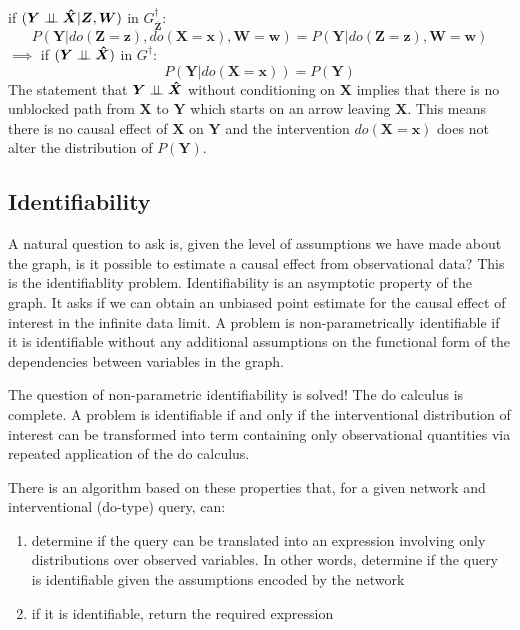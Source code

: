 \documentclass[11pt,a4paper,oneside]{book}
\theoremstyle{plain}
\theoremstyle{definition}
\begin{document}
if $(\boldsymbol{Y} \perp\!\!\!\perp \boldsymbol{\hat{X}} |\boldsymbol{Z},\boldsymbol{W})$ in $G^{\dagger}_{\boldsymbol{\overline{Z}}}$:
\begin{equation}
\label{eq:Do3}
P(\boldsymbol{Y}|do(\boldsymbol{Z}=\boldsymbol{z}),do(\boldsymbol{X}=\boldsymbol{x}),\boldsymbol{W}=\boldsymbol{w}) = P(\boldsymbol{Y}|do(\boldsymbol{Z}=\boldsymbol{z}),\boldsymbol{W}=\boldsymbol{w})
\end{equation}
$\implies$ if  $(\boldsymbol{Y} \perp\!\!\!\perp \boldsymbol{\hat{X}})$ in $G^{\dagger}$:
\begin{equation}
\label{eq:Do32}
P(\boldsymbol{Y}|do(\boldsymbol{X}=\boldsymbol{x})) = P(\boldsymbol{Y})
\end{equation}
The statement that $\boldsymbol{Y} \perp\!\!\!\perp \boldsymbol{\hat{X}}$ without conditioning on $\boldsymbol{X}$ implies that there is no unblocked path from $\boldsymbol{X}$ to $\boldsymbol{Y}$ which starts on an arrow leaving $\boldsymbol{X}$. This means there is no causal effect of $\boldsymbol{X}$ on $\boldsymbol{Y}$ and the intervention $do(\boldsymbol{X}=\boldsymbol{x})$ does not alter the distribution of $P(\boldsymbol{Y})$.

\subsection{Identifiability}
A natural question to ask is, given the level of assumptions we have made about the graph, is it possible to estimate a causal effect from observational data? This is the identifiablity problem. Identifiability is an asymptotic property of the graph. It asks if we can obtain an unbiased point estimate for the causal effect of interest in the infinite data limit. A problem is non-parametrically identifiable if it is identifiable without any additional assumptions on the functional form of the dependencies between variables in the graph. 

The question of non-parametric identifiability is solved! The do calculus is complete. A problem is identifiable if and only if the interventional distribution of interest can be transformed into term containing only observational quantities via repeated application of the do calculus. 

There is an algorithm \cite{Shpitser2012} based on these properties that, for a given network and interventional (do-type) query, can:

\begin{enumerate}
\item determine if the query can be translated into an expression involving only distributions over observed variables. In other words, determine if the query is identifiable given the assumptions encoded by the network
\item if it is identifiable, return the required expression 
\end{enumerate}
\end{document}
